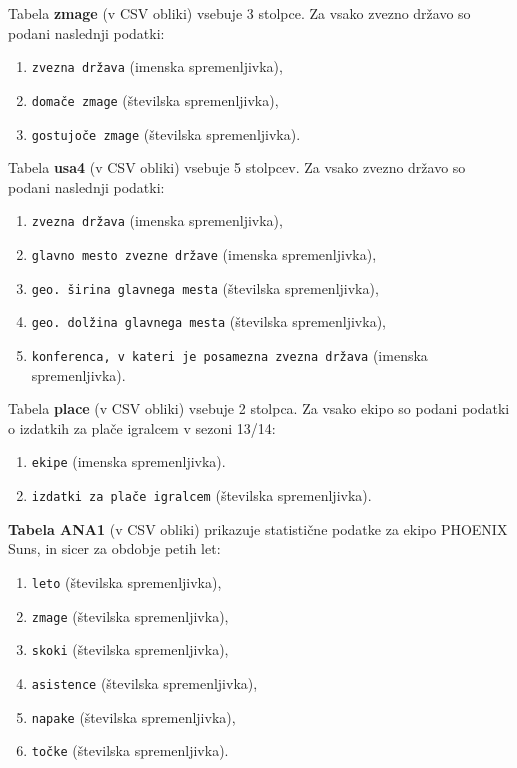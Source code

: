 \documentclass[11pt,a4paper]{article}
\begin{document}
\newline

Tabela \textbf{zmage} (v CSV obliki) vsebuje 3 stolpce. Za vsako zvezno državo so podani naslednji podatki:

\begin{enumerate}
\item{\verb|zvezna država| (imenska spremenljivka),}
\item{\verb|domače zmage| (številska spremenljivka),}
\item{\verb|gostujoče zmage| (številska spremenljivka).}
\end{enumerate}

\newline
Tabela \textbf{usa4} (v CSV obliki) vsebuje 5 stolpcev. Za vsako zvezno državo so podani naslednji podatki:

\begin{enumerate}
\item{\verb|zvezna država| (imenska spremenljivka),}
\item{\verb|glavno mesto zvezne države| (imenska spremenljivka),}
\item{\verb|geo. širina glavnega mesta| (številska spremenljivka),}
\item{\verb|geo. dolžina glavnega mesta| (številska spremenljivka),}
\item{\verb|konferenca, v kateri je posamezna zvezna država| (imenska spremenljivka).}
\end{enumerate}

\newline
Tabela \textbf{place} (v CSV obliki) vsebuje 2 stolpca. Za vsako ekipo so podani podatki o izdatkih za plače igralcem v sezoni 13/14:

\begin{enumerate}
\item{\verb|ekipe| (imenska spremenljivka).}
\item{\verb|izdatki za plače igralcem| (številska spremenljivka).}
\end{enumerate}

\newline
\textbf{Tabela ANA1} (v CSV obliki) prikazuje statistične podatke za ekipo PHOENIX Suns, in sicer za obdobje petih let:

\begin{enumerate}
\item{\verb|leto| (številska spremenljivka),}
\item{\verb|zmage| (številska spremenljivka),}
\item{\verb|skoki| (številska spremenljivka),}
\item{\verb|asistence| (številska spremenljivka),}
\item{\verb|napake| (številska spremenljivka),}
\item{\verb|točke| (številska spremenljivka).}
\end{enumerate}
\end{document}
